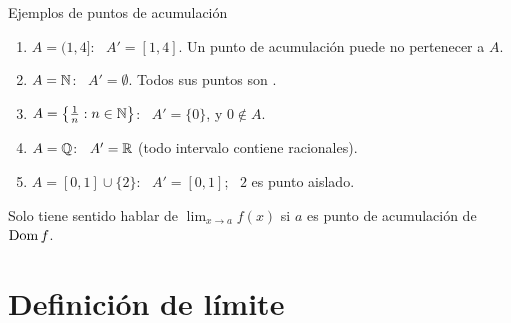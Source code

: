 \documentclass[10pt,aspectratio=169]{beamer}
\begin{document}
\begin{frame}{Ejemplos de puntos de acumulación}
  \begin{ejemplo}
    \begin{enumerate}
      \item $A=(1,4]$: \ $A'=[1,4]$. Un punto de acumulación puede no pertenecer a $A$.
      \item $A=\mathbb{N}$: \ $A'=\emptyset$. Todos sus puntos son .
      \item $A=\left\{\frac1n:n\in\mathbb{N}\right\}$: \ $A'=\{0\}$, y $0\notin A$.
      \item $A=\mathbb{Q}$: \ $A'=\mathbb{R}$ (todo intervalo contiene racionales).
      \item $A=[0,1]\cup\{2\}$: \ $A'=[0,1]$; \ $2$ es punto aislado.
    \end{enumerate}
  \end{ejemplo}
  \begin{center}
  \end{center}
  \begin{observacion}
    Solo tiene sentido hablar de $\lim_{x\to a}f(x)$ si $a$ es punto de acumulación de $\operatorname{Dom} f$.
  \end{observacion}
\end{frame}

\section{Definición de límite}
\end{document}
